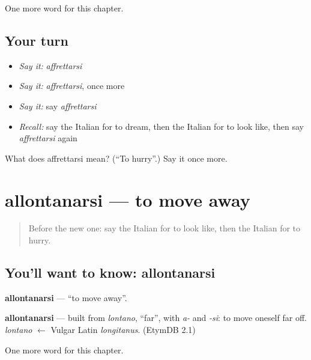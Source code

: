 \begin{grammarlens}[title={What you've built}]
One more word for this chapter.
\end{grammarlens}

\subsection*{Your turn}
\begin{itemize}
\raggedright
  \item \emph{Say it:} \emph{affrettarsi}
  \item \emph{Say it:} \emph{affrettarsi}, once more
  \item \emph{Say it:} say \emph{affrettarsi}
  \item \emph{Recall:} say the Italian for to dream, then the Italian for to look like, then say \emph{affrettarsi} again
\end{itemize}

\begin{tcolorbox}[breakable,colback=teal!4,colframe=teal!35!black,title={Before you move on}]
What does affrettarsi mean? (\textquotedblleft{}To hurry\textquotedblright{}.) Say it once more.
\end{tcolorbox}
\section[allontanarsi]{allontanarsi — to move away}

\label{lesson:IT-C212-allontanarsi}



\begin{quote}
Before the new one: say the Italian for to look like, then the Italian for to hurry.
\end{quote}

\subsection*{You'll want to know: allontanarsi}
\textbf{allontanarsi} — \textquotedblleft{}to move away\textquotedblright{}.

\begin{cousinweb}
\textbf{allontanarsi} — built from \emph{lontano}, \textquotedblleft{}far\textquotedblright{}, with \emph{a-} and \emph{-si}: to move oneself far off. \emph{lontano} $\leftarrow$ Vulgar Latin \emph{longitanus}. (EtymDB 2.1)
\end{cousinweb}

\begin{grammarlens}[title={What you've built}]
One more word for this chapter.
\end{grammarlens}


